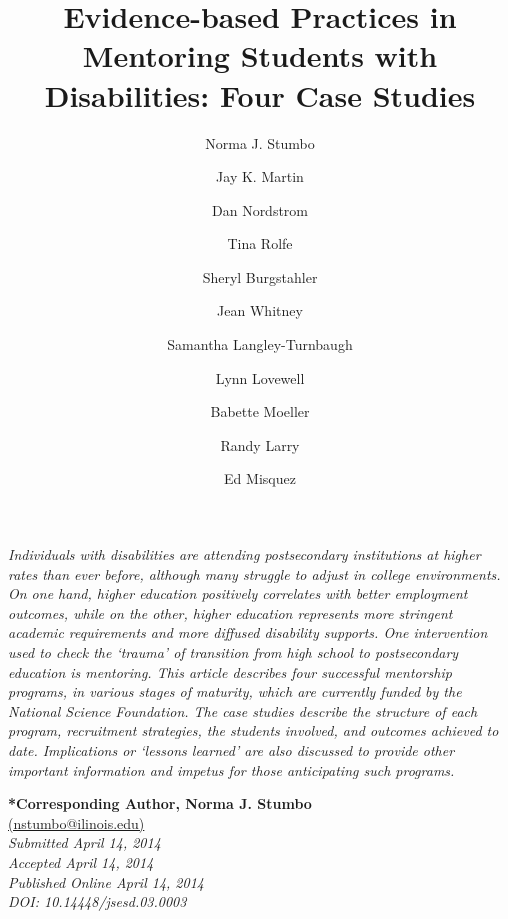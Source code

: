 \documentclass[11.5pt]{sig-alternate} %
\makeatletter
\let\oldabstract\abstract
\let\oldendabstract\endabstract
\renewenvironment{abstract} %
{\renewenvironment{quotation}%
               {\list{}{\addtolength{\leftmargin}{1em} %
                        \listparindent 1.5em%
                        \itemindent    \listparindent%
                        \rightmargin   \leftmargin%
                        \parsep        \z@ \@plus\p@}%
                \item\relax}%
               {\endlist}%
\oldabstract}
{\oldendabstract}
\makeatother
\begin{document}
\title{Evidence-based Practices in Mentoring Students with Disabilities: Four Case Studies}

\author[ ]{\large \color{blue} Norma J. Stumbo}
\author[1]{\large \color{blue} Jay K. Martin}
\author[ ]{\large \color{blue} Dan Nordstrom}
\author[ ]{\large \color{blue} Tina Rolfe}
\author[ ]{\large \color{blue} Sheryl Burgstahler}
\author[ ]{\large \color{blue} Jean Whitney}
\author[2]{\large \color{blue} Samantha Langley-Turnbaugh}
\author[ ]{\large \color{blue} Lynn Lovewell}
\author[ ]{\large \color{blue} Babette Moeller}
\author[ ]{\large \color{blue} Randy Larry}
\author[ ]{\large \color{blue} Ed Misquez}


\toappear{}

\maketitle
\begin{@twocolumnfalse} 
\begin{abstract}
\item 
\begin{large}
\textit{Individuals with disabilities are attending postsecondary institutions at higher rates than ever before, although many struggle to adjust in college environments. On one hand, higher education positively correlates with better employment outcomes, while on the other, higher education represents more stringent academic requirements and more diffused disability supports. One intervention used to check the ‘trauma’ of transition from high school to postsecondary education is mentoring. This article describes four successful mentorship programs, in various stages of maturity, which are currently funded by the National Science Foundation. The case studies describe the structure of each program, recruitment strategies, the students involved, and outcomes achieved to date. Implications or ‘lessons learned’ are also discussed to provide other important information and impetus for those anticipating such programs.} \\

\end{large} 
\end{abstract}
\end{@twocolumnfalse}



\textbf{*Corresponding Author, Norma J. Stumbo}\\
\href{mailto:nstumbo@ilinois.edu}{(nstumbo@ilinois.edu)}\\
\textit{Submitted April 14, 2014}\\
\textit{Accepted April 14, 2014}\\
\textit{Published Online April 14, 2014}\\
\textit{DOI: 10.14448/jsesd.03.0003}\\
\end{document}
